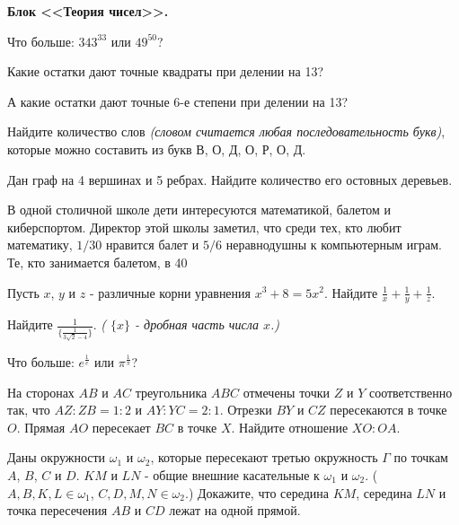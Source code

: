 \documentclass[12pt, a4paper]{article}
\begin{document}
\setcounter{iii}{0}

\begin{center}
	\textbf{Блок <<Теория чисел>>.}
\end{center}

\ii Что больше: $343^{33}$ или $49^{50}$?

\ii Какие остатки дают точные квадраты при делении на 13?

\ii А какие остатки дают точные 6-е степени при делении на 13?

\ii Найдите количество слов \textit{(словом считается любая последовательность букв)}, которые можно составить из букв В, О, Д, О, Р, О, Д. 

\ii Дан граф на 4 вершинах и 5 ребрах. Найдите количество его остовных деревьев.

\ii В одной столичной школе дети интересуются математикой, балетом и киберспортом. Директор этой школы заметил, что среди тех, кто любит математику, $1/30$ нравится балет и $5/6$ неравнодушны к компьютерным играм. Те, кто занимается балетом, в 40%

\ii Пусть $x$, $y$ и $z$ - различные корни уравнения $x^3+8=5x^2$. Найдите $\frac{1}{x}+\frac{1}{y}+\frac{1}{z}$.

\ii Найдите $\frac{1}{ \{ \frac{1}{ 3\sqrt{2} - 4 } \} }$. \textit{( $\{ x \}$ - дробная часть числа $x$.)}

\ii Что больше: $e^{\frac{1}{e}}$ или $\pi^{\frac{1}{\pi}}$?

\ii На сторонах $AB$ и $AC$ треугольника $ABC$ отмечены точки $Z$ и $Y$ соответственно так, что $AZ:ZB = 1:2$ и $AY:YC=2:1$. Отрезки $BY$ и $CZ$ пересекаются в точке $O$. Прямая $AO$ пересекает $BC$ в точке $X$. Найдите отношение $XO:OA$.

\ii Даны окружности $\omega_1$ и $\omega_2$, которые пересекают третью окружность $\Gamma$ по точкам $A$, $B$, $C$ и $D$. $KM$ и $LN$ - общие внешние касательные к $\omega_1$ и $\omega_2$. ($A,B,K,L \in \omega_1$, $C,D,M,N \in \omega_2$.) Докажите, что середина $KM$, середина $LN$ и точка пересечения $AB$ и $CD$ лежат на одной прямой.

\vfill
	
\end{document}
